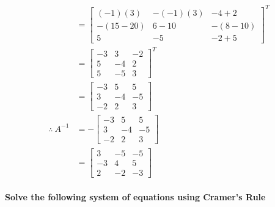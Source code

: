 \documentclass[
  letterpaper,
  DIV=11,
  numbers=noendperiod]{scrartcl}
\let\oldparagraph\paragraph
\renewcommand{\paragraph}[1]{\oldparagraph{#1}\mbox{}}
\begin{document}
\begin{align*}
&= \begin{bmatrix}(-1)(3) & -(-1)(3) & -4+2 \\ -(15-20) & 6-10 & -(8-10) \\ 5 & -5 & -2+5\end{bmatrix}^T \\
&= \begin{bmatrix}-3 & 3 & -2 \\ 5 & -4 & 2 \\ 5 & -5 & 3\end{bmatrix}^T \\
&= \begin{bmatrix}-3 & 5 & 5 \\ 3 & -4 & -5 \\ -2 & 2 & 3\end{bmatrix} \\
\therefore \ A^{-1} &= -\begin{bmatrix}-3 & 5 & 5 \\ 3 & -4 & -5 \\ -2 & 2 & 3\end{bmatrix} \\
&= \begin{bmatrix}3 & -5 & -5 \\ -3 & 4 & 5 \\ 2 & -2 & -3\end{bmatrix}
\end{align*}

\newpage{}

\hypertarget{solve-the-following-system-of-equations-using-cramers-rule}{%
\paragraph{Solve the following system of equations using Cramer's
Rule}\label{solve-the-following-system-of-equations-using-cramers-rule}}
\end{document}
